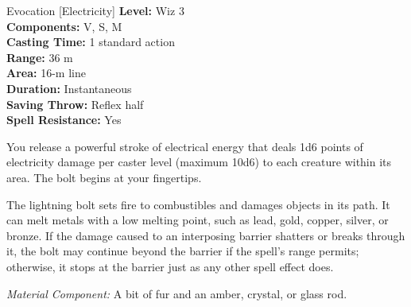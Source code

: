 {Evocation [Electricity]}
{
	\textbf{Level:}
	Wiz 3\\
	\textbf{Components:}
	V, S, M\\
	\textbf{Casting Time:}
	1 standard action\\
	\textbf{Range:}
	36 m\\
	\textbf{Area:}
	16-m line\\
	\textbf{Duration:}
	Instantaneous\\
	\textbf{Saving Throw:}
	Reflex half\\
	\textbf{Spell Resistance:}
	Yes\\
}
{
	You release a powerful stroke of electrical energy that deals 1d6 points of electricity damage per caster level (maximum 10d6) to each creature within its area. The bolt begins at your fingertips.

	The lightning bolt sets fire to combustibles and damages objects in its path. It can melt metals with a low melting point, such as lead, gold, copper, silver, or bronze. If the damage caused to an interposing barrier shatters or breaks through it, the bolt may continue beyond the barrier if the spell's range permits; otherwise, it stops at the barrier just as any other spell effect does.

	\textit{Material Component:}
	A bit of fur and an amber, crystal, or glass rod.

}
